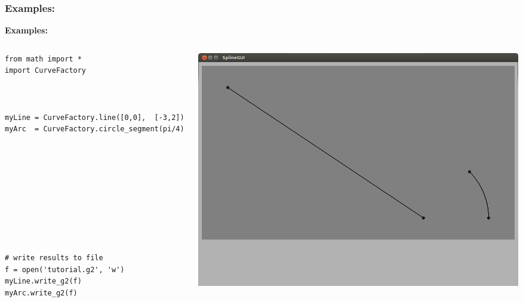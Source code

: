 \documentclass{beamer}
\theoremstyle{plain}
\theoremstyle{definition}
\begin{document}
\begin{frame}[fragile]
\frametitle{Examples:}
\textbf{Examples:}
\begin{columns}
    \begin{column}{.50\linewidth}
        \begin{listing}[H]
            \tiny
            \begin{verbatim}
from math import *
import CurveFactory                                                            


                                                                               
myLine = CurveFactory.line([0,0],  [-3,2])                                   
myArc  = CurveFactory.circle_segment(pi/4)                                     










# write results to file                                                        
f = open('tutorial.g2', 'w')                                                   
myLine.write_g2(f)
myArc.write_g2(f)
            \end{verbatim}
        \end{listing}
    \end{column}
    \begin{column}{.45\linewidth}
        \includegraphics[width=\linewidth]{tutorial1}
    \end{column}
\end{columns}

\end{frame}
\end{document}
